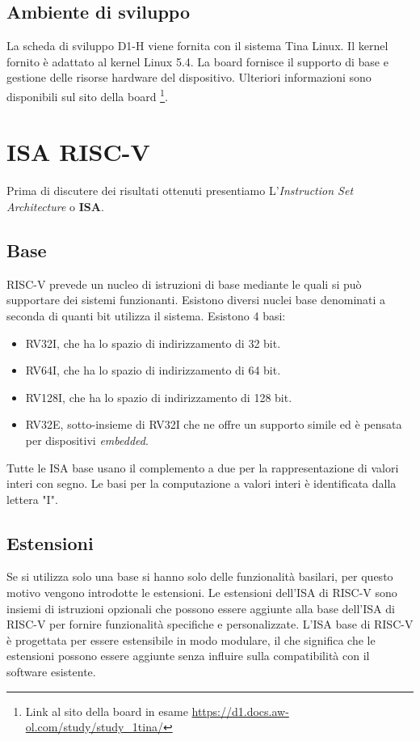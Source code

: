 \documentclass[12pt, a4paper]{report}
\begin{document}
\section{Ambiente di sviluppo}
La scheda di sviluppo D1-H viene fornita con il sistema Tina Linux. Il kernel fornito è adattato al kernel Linux 5.4. La board fornisce il supporto di base e gestione delle risorse hardware del dispositivo. Ulteriori informazioni sono disponibili sul sito della board
\footnote{Link al sito della board in esame \url{https://d1.docs.aw-ol.com/study/study_1tina/}}.


% 
\chapter{ISA RISC-V}
Prima di discutere dei risultati ottenuti presentiamo L'\textit{Instruction Set Architecture} o \textbf{ISA}.
\section{Base}
RISC-V prevede un nucleo di istruzioni di base mediante le quali si può supportare dei sistemi funzionanti. Esistono diversi nuclei base denominati a seconda di quanti bit utilizza il sistema. Esistono 4 basi:
\begin{itemize}
	\item RV32I, che ha lo spazio di indirizzamento di 32 bit. 
	\item RV64I, che ha lo spazio di indirizzamento di 64 bit.
	\item RV128I, che ha lo spazio di indirizzamento di 128 bit.
	\item RV32E, sotto-insieme di RV32I che ne offre un supporto simile ed è pensata per dispositivi \textit{embedded}.
\end{itemize}
Tutte le ISA base usano il complemento a due per la rappresentazione di valori interi con segno. Le basi per la computazione a valori interi è identificata dalla lettera "I". 

\section{Estensioni} \label{estensioni}
Se si utilizza solo una base si hanno solo delle funzionalità basilari, per questo motivo vengono introdotte le estensioni. Le estensioni dell'ISA di RISC-V sono insiemi di istruzioni opzionali che possono essere aggiunte alla base dell'ISA di RISC-V per fornire funzionalità specifiche e personalizzate. L'ISA base di RISC-V è progettata per essere estensibile in modo modulare, il che significa che le estensioni possono essere aggiunte senza influire sulla compatibilità con il software esistente.
\end{document}
